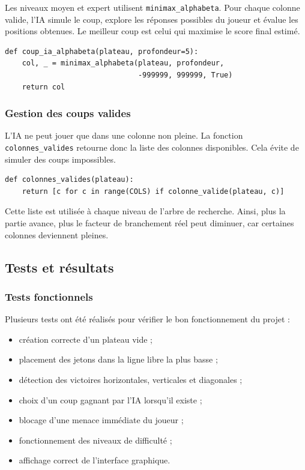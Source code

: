 \documentclass[12pt,a4paper]{article}
\begin{document}
Les niveaux moyen et expert utilisent \texttt{minimax\_alphabeta}. Pour chaque colonne valide, l'IA simule le coup, explore les réponses possibles du joueur et évalue les positions obtenues. Le meilleur coup est celui qui maximise le score final estimé.

\begin{lstlisting}[style=pythonstyle, caption={Appel de l'IA alpha-bêta}]
def coup_ia_alphabeta(plateau, profondeur=5):
    col, _ = minimax_alphabeta(plateau, profondeur,
                               -999999, 999999, True)
    return col
\end{lstlisting}

\subsubsection{Gestion des coups valides}

L'IA ne peut jouer que dans une colonne non pleine. La fonction \texttt{colonnes\_valides} retourne donc la liste des colonnes disponibles. Cela évite de simuler des coups impossibles.

\begin{lstlisting}[style=pythonstyle, caption={Liste des colonnes jouables}]
def colonnes_valides(plateau):
    return [c for c in range(COLS) if colonne_valide(plateau, c)]
\end{lstlisting}

Cette liste est utilisée à chaque niveau de l'arbre de recherche. Ainsi, plus la partie avance, plus le facteur de branchement réel peut diminuer, car certaines colonnes deviennent pleines.


\subsection{Tests et résultats}

\subsubsection{Tests fonctionnels}

Plusieurs tests ont été réalisés pour vérifier le bon fonctionnement du projet :

\begin{itemize}[leftmargin=1.2cm]
    \item création correcte d'un plateau vide ;
    \item placement des jetons dans la ligne libre la plus basse ;
    \item détection des victoires horizontales, verticales et diagonales ;
    \item choix d'un coup gagnant par l'IA lorsqu'il existe ;
    \item blocage d'une menace immédiate du joueur ;
    \item fonctionnement des niveaux de difficulté ;
    \item affichage correct de l'interface graphique.
\end{itemize}
\end{document}
